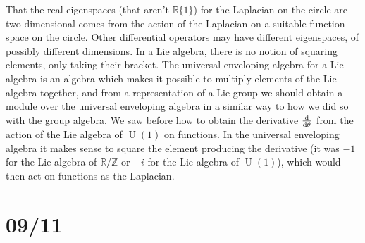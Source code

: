 \documentclass[11pt,leqno]{article}
\theoremstyle{plain}
\theoremstyle{definition}
\numberwithin{equation}{section}
\numberwithin{lem}{section}
\DeclareMathOperator{\U}{U}
\begin{document}
That the real eigenspaces (that aren't $\mathbb R\{1\}$) for the Laplacian on the circle are two-dimensional comes from the action of the Laplacian on a suitable function space on the circle. Other differential operators may have different eigenspaces, of possibly different dimensions. In a Lie algebra, there is no notion of squaring elements, only taking their bracket. The universal enveloping algebra for a Lie algebra is an algebra which makes it possible to multiply elements of the Lie algebra together, and from a representation of a Lie group we should obtain a module over the universal enveloping algebra in a similar way to how we did so with the group algebra. We saw before how to obtain the derivative $\dv{\theta}$ from the action of the Lie algebra of $\U(1)$ on functions. In the universal enveloping algebra it makes sense to square the element producing the derivative (it was $-1$ for the Lie algebra of $\mathbb R/\mathbb Z$ or $-i$ for the Lie algebra of $\U(1)$), which would then act on functions as the Laplacian.

\newpage\section{09/11}


\end{document}

